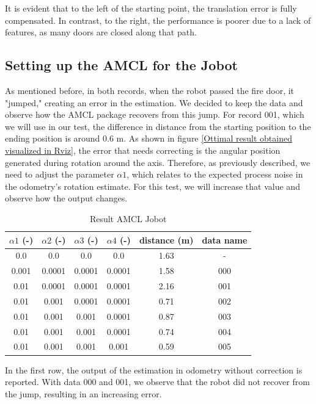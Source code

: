 It is evident that to the left of the starting point, the translation error is fully compensated. In contrast, to the right, the performance is poorer due to a lack of features, as many doors are closed along that path.

\subsection{Setting up the AMCL for the Jobot}

As mentioned before, in both records, when the robot passed the fire door, it "jumped," creating an error in the estimation. We decided to keep the data and observe how the AMCL package recovers from this jump. For record 001, which we will use in our test, the difference in distance from the starting position to the ending position is around 0.6 m. As shown in figure \ref{Ottimal result obtained visualized in Rviz}, the error that needs correcting is the angular position generated during rotation around the axis. Therefore, as previously described, we need to adjust the parameter $\alpha 1$, which relates to the expected process noise in the odometry's rotation estimate. For this test, we will increase that value and observe how the output changes.


\begin{table}[H]
	\centering
	\begin{tabular}{|c|c|c|c|c|c|}
		\hline
		$\alpha 1$ (-) & $\alpha 2$ (-) & $\alpha 3$ (-) & $\alpha 4$ (-) & distance (m) & data name\\
		\hline
		0.0 & 0.0 & 0.0 & 0.0 & 1.63 &  - \\
		\hline
		0.001 & 0.0001 & 0.0001 & 0.0001 & 1.58 & 000 \\
		\hline
		0.01 & 0.0001 & 0.0001 & 0.0001 & 2.16 & 001 \\
		\hline
		0.01 & 0.001 & 0.0001 & 0.0001 & 0.71 & 002 \\
		\hline
		0.01 & 0.001 & 0.001 & 0.0001 & 0.87 & 003 \\
		\hline
		0.01 & 0.001 & 0.001 & 0.0001 & 0.74 & 004 \\
		\hline
		0.01 & 0.001 & 0.001 & 0.001 & 0.59 & 005 \\
		\hline
	\end{tabular}
	\caption{Result AMCL Jobot}
\end{table}

In the first row, the output of the estimation in odometry without correction is reported. With data 000 and 001, we observe that the robot did not recover from the jump, resulting in an increasing error.

